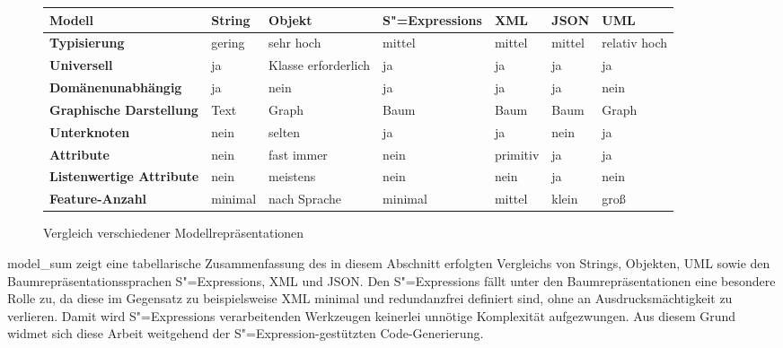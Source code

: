 \documentclass[11pt, a4paper, bibgerm]{scrbook}
\newcommand\abb{}
\newcommand{\sexp}{S"=Expression}
\newcommand{\sexps}{S"=Expressions}
\begin{document}
\begin{figure}
  \centering
\begin{tabular}{|l|l|l|l|l|l|l|}\hline
\bf Modell                        & \bf String & \bf Objekt           & \bf \sexps{}    & \bf XML  & \bf JSON & \bf UML         \\\hline\hline
\bf Typisierung                   & gering     & sehr hoch            & mittel          & mittel   & mittel   & relativ hoch    \\\hline
\bf Universell                    & ja         & Klasse erforderlich  & ja              & ja       & ja       & ja              \\\hline
\bf Domänenunabhängig             & ja         & nein                 & ja              & ja       & ja       & nein            \\\hline
\bf Graphische Darstellung        & Text       & Graph                & Baum            & Baum     & Baum     & Graph           \\\hline
\bf Unterknoten                   & nein       & selten               & ja              & ja       & nein     & ja              \\\hline
\bf Attribute                     & nein       & fast immer           & nein            & primitiv & ja       & ja              \\\hline
\bf Listenwertige Attribute       & nein       & meistens             & nein            & nein     & ja       & nein            \\\hline
\bf Feature-Anzahl                & minimal    & nach Sprache         & minimal         & mittel   & klein    & groß            \\\hline
\end{tabular}
  \caption{Vergleich verschiedener Modellrepräsentationen}
  \label{magicl:fig:model_sum}
\end{figure}

\abb{model_sum} zeigt eine tabellarische Zusammenfassung des in diesem
Abschnitt erfolgten Vergleichs von Strings, Objekten, UML sowie den
Baumrepräsentationssprachen \sexps{}, XML und JSON. Den \sexps{} fällt
unter den Baumrepräsentationen eine besondere Rolle zu, da diese im
Gegensatz zu beispielsweise XML minimal und redundanzfrei definiert
sind, ohne an Ausdrucksmächtigkeit zu verlieren. Damit wird \sexps{}
verarbeitenden Werkzeugen keinerlei unnötige Komplexität
aufgezwungen. Aus diesem Grund widmet sich diese Arbeit weitgehend der
\sexp-gestützten Code-Generierung.
\end{document}
